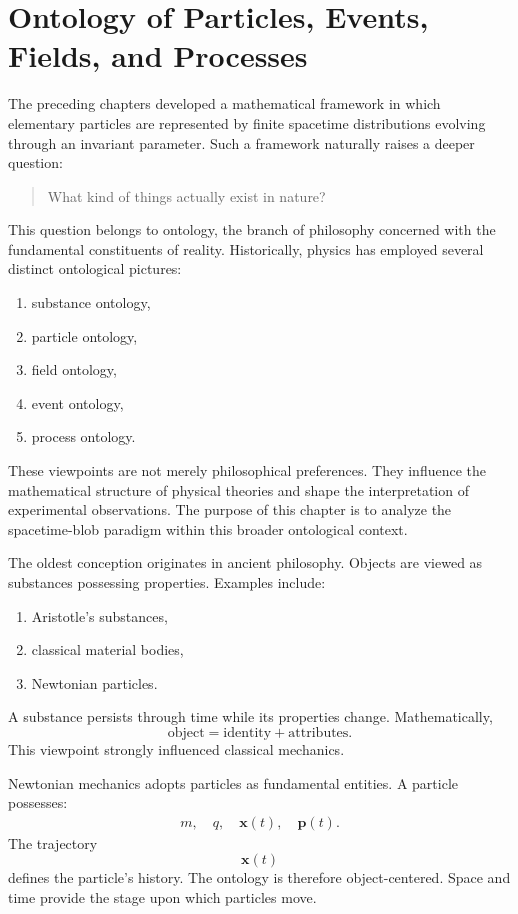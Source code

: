 \section{Ontology of Particles, Events, Fields, and Processes}
The preceding chapters developed a mathematical framework in which elementary
particles are represented by finite spacetime distributions evolving through
an invariant parameter. Such a framework naturally raises a deeper question:
\begin{quote}
What kind of things actually exist in nature?
\end{quote}
This question belongs to ontology, the branch of philosophy concerned with
the fundamental constituents of reality.
Historically, physics has employed several distinct ontological pictures:
\begin{enumerate}
\item substance ontology,
\item particle ontology,
\item field ontology,
\item event ontology,
\item process ontology.
\end{enumerate}
These viewpoints are not merely philosophical preferences. They influence 
the mathematical structure of physical theories and shape the interpretation
of experimental observations.
The purpose of this chapter is to analyze the spacetime-blob paradigm within
this broader ontological context.

The oldest conception originates in ancient philosophy.
Objects are viewed as substances possessing properties.
Examples include:
\begin{enumerate}
\item Aristotle's substances,
\item classical material bodies,
\item Newtonian particles.
\end{enumerate}
A substance persists through time while its properties change.
Mathematically,
\begin{equation}
\text{object} = \text{identity} + \text{attributes}.
\end{equation}
This viewpoint strongly influenced classical mechanics.

Newtonian mechanics adopts particles as fundamental entities.
A particle possesses:
\begin{align}
m,\quad q, \quad \mathbf{x}(t), \quad \mathbf{p}(t).
\end{align}
The trajectory
\begin{equation}
\mathbf{x}(t)
\end{equation}
defines the particle's history.
The ontology is therefore object-centered.
Space and time provide the stage upon which particles move.

